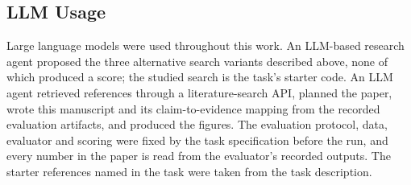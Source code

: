 \documentclass{article}
\begin{document}
\subsection{LLM Usage}
\label{app:llm}
Large language models were used throughout this work. An LLM-based research agent proposed the three alternative search variants described above, none of which produced a score; the studied search is the task's starter code. An LLM agent retrieved references through a literature-search API, planned the paper, wrote this manuscript and its claim-to-evidence mapping from the recorded evaluation artifacts, and produced the figures. The evaluation protocol, data, evaluator and scoring were fixed by the task specification before the run, and every number in the paper is read from the evaluator's recorded outputs. The starter references named in the task were taken from the task description.
\end{document}
